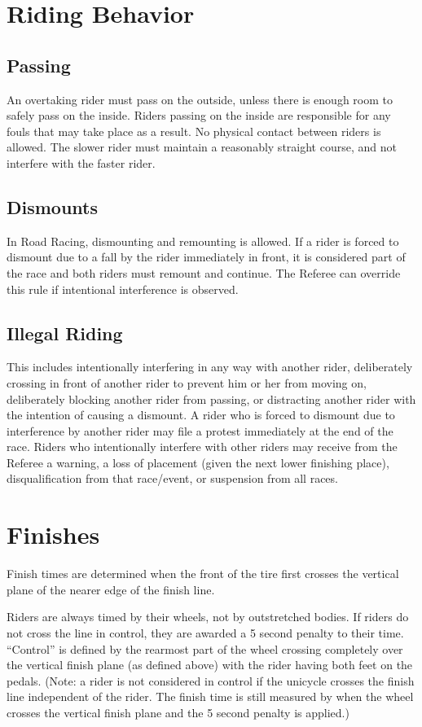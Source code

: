 \section{Riding Behavior}

\subsection{Passing}
An overtaking rider must pass on the outside, unless there is enough room to safely pass on the inside.
Riders passing on the inside are responsible for any fouls that may take place as a result.
No physical contact between riders is allowed.
The slower rider must maintain a reasonably straight course, and not interfere with the faster rider.

\subsection{Dismounts}
In Road Racing, dismounting and remounting is allowed. 
If a rider is forced to dismount due to a fall by the rider immediately in front, it is considered part of the race and both riders must remount and continue.
The Referee can override this rule if intentional interference is observed.

\subsection{Illegal Riding}
This includes intentionally interfering in any way with another rider, deliberately crossing in front of another rider to prevent him or her from moving on, deliberately blocking another rider from passing, or distracting another rider with the intention of causing a dismount.
A rider who is forced to dismount due to interference by another rider may file a protest immediately at the end of the race.
Riders who intentionally interfere with other riders may receive from the Referee a warning, a loss of placement (given the next lower finishing place), disqualification from that race/event, or suspension from all races.

\section{Finishes}
Finish times are determined when the front of the tire first crosses the vertical plane of the nearer edge of the finish line.

Riders are always timed by their wheels, not by outstretched bodies.
If riders do not cross the line in control, they are awarded a 5 second penalty to their time.
``Control'' is defined by the rearmost part of the wheel crossing completely over the vertical finish plane (as defined above) with the rider having both feet on the pedals.
(Note: a rider is not considered in control if the unicycle crosses the finish line independent of the rider.
The finish time is still measured by when the wheel crosses the vertical finish plane and the 5 second penalty is applied.)

